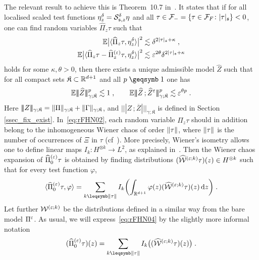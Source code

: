 \documentclass[reqno,11pt]{article}
\def\normDgamma#1{|\!|\!|#1|\!|\!|}
\def\seminormff#1#2{|\!|\!|#1\,\mathord{;}\,#2|\!|\!|}
\def\fraks{\mathfrak{s}}
\def\fraK{\mathfrak{K}}
\def\abss#1{\abs{#1}_\mathfrak{s}}
\def\Zbar{\overbar Z}
\def\Pihat{\widehat\Pi}
\begin{document}
The relevant result to achieve this is Theorem~10.7 in~\cite{Hairer2014}. It
states that if for all localised scaled test functions $\eta^\delta_z =
\cS^\delta_{\fraks,z}\eta$ and all $\tau\in\cF_- =
\setsuch{\tau\in\cF_F}{\abss{\tau}} < 0$, one can find random
variables $\widehat \Pi_z\tau$ such that
\begin{align}
\nonumber
\E\bigabs{\pscal{\widehat \Pi_z\tau}{\eta^\delta_z}}^2 
&\lesssim \delta^{2\abss{\tau}+\kappa}\;, \\
\E\bigabs{\pscal{\widehat \Pi_z\tau - \widehat
\Pi_z^{(\eps)}\tau}{\eta^\delta_z}}^2 
&\lesssim \eps^{2\theta}\delta^{2\abss{\tau}+\kappa}
 \label{eq:rFHN02} 
\end{align}
holds for some $\kappa, \theta>0$, then there exists a unique admissible model
$\widehat Z$ such that for all compact sets $\fraK\subset\R^{d+1}$ and all
$p\geqs 1$ one has 
\begin{equation}
\E \normDgamma{\widehat Z}^p_{\gamma;\fraK} \lesssim 1\;, 
\qquad 
\E \seminormff{\widehat Z}{\widehat Z^\eps}^p_{\gamma;\fraK} \lesssim
\eps^{\theta p}\;.
 \label{eq:rFHN03} 
\end{equation} 
Here $\normDgamma{Z}_{\gamma;\fraK} = \norm{\Pi}_{\gamma;\fraK} +
\norm{\Gamma}_{\gamma;\fraK}$, and $\seminormff{Z}{\Zbar}_{\gamma;\fraK}$ 
is defined in Section \ref{ssec_fix_exist}. 
In~\eqref{eq:rFHN02}, each random variable $\widehat \Pi_z\tau$ should in
addition belong to the inhomogeneous Wiener chaos of order $\lVert\tau\rVert$, where
$\lVert\tau\rVert$ is the number of occurrences of $\Xi$ in $\tau$
(cf~\cite[Section~10.1]{Hairer2014}). More precisely, Wiener's isometry
allows one to define linear maps $I_k:H^{\otimes k}\to L^2$, as explained
in~\cite[Section~10.1]{Hairer2014}. Then the Wiener chaos expansion of
$\Pihat_0^{(\eps)}\tau$ is obtained by finding distributions
$(\widehat{{\mathcal W}}^{(\varepsilon;k)}\tau)(z)\in H^{\otimes k}$ such that for every
test function $\varphi$, 
\begin{equation}
 \label{eq:rFHN04}
 \pscal{\Pihat_0^{(\eps)}\tau}{\varphi}
 = \sum_{k\leqs\norm{\tau}}
 I_k \biggpar{\int_{\R^{d+1}} \varphi(z)(\widehat\cW^{(\eps;k)}\tau)(z)\6z}\;.
\end{equation} 
Let further ${\mathcal W}^{(\varepsilon;k)}$ be the distributions defined in a similar way from
the bare model $\Pi^\varepsilon$.
As usual, we will express~\eqref{eq:rFHN04} by the slightly more informal
notation 
\begin{equation}
 \label{eq:rFHN04b}
 (\Pihat_0^{(\eps)}\tau)(z)
 = \sum_{k\leqs\norm{\tau}}
 I_k \bigpar{(\widehat\cW^{(\eps;k)}\tau)(z)}\;.
\end{equation} 
\end{document}
